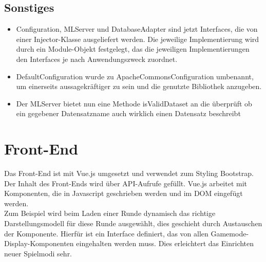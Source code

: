 \documentclass[a4paper]{scrreprt}
\begin{document}
\section{Sonstiges}
\begin{itemize}
    \item Configuration, MLServer und DatabaseAdapter sind jetzt Interfaces, die von einer Injector-Klasse ausgeliefert werden.
    Die jeweilige Implementierung wird durch ein Module-Objekt festgelegt, das die jeweiligen Implementierungen den Interfaces je nach Anwendungszweck zuordnet.
    \item DefaultConfiguration wurde zu ApacheCommonsConfiguration umbenannt, um einerseits aussagekräftiger zu sein und die genutzte Bibliothek anzugeben.
    \item Der MLServer bietet nun eine Methode isValidDataset an die überprüft ob ein gegebener Datensatzname auch wirklich einen Datensatz beschreibt
\end{itemize}

\chapter{Front-End}
Das Front-End ist mit Vue.js umgesetzt und verwendet zum Styling Bootstrap. Der Inhalt des Front-Ends wird über API-Aufrufe gefüllt.
Vue.js arbeitet mit Komponenten, die in Javascript geschrieben werden und im DOM eingefügt werden. \\
Zum Beispiel wird beim Laden einer Runde dynamisch das richtige Darstellungsmodell für diese Runde ausgewählt, dies geschieht durch Austauschen der Komponente. Hierfür ist ein Interface definiert, das von allen Gamemode-Display-Komponenten eingehalten werden muss. Dies erleichtert das Einrichten neuer Spielmodi sehr.
\end{document}
